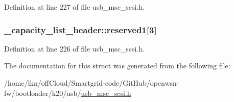 Definition at line 227 of file usb\+\_\+msc\+\_\+scsi.\+h.

\subsubsection[{\texorpdfstring{reserved1}{reserved1}}]{ \+\_\+capacity\+\_\+list\+\_\+header\+::reserved1\mbox{[}3\mbox{]}}\hypertarget{struct__capacity__list__header_a08fab2ca6acf1044c6f6d4ef700fd8a4}{}\label{struct__capacity__list__header_a08fab2ca6acf1044c6f6d4ef700fd8a4}


Definition at line 226 of file usb\+\_\+msc\+\_\+scsi.\+h.



The documentation for this struct was generated from the following file\+:\begin{DoxyCompactItemize}
\item 
/home/lkn/off\+Cloud/\+Smartgrid-\/code/\+Git\+Hub/openwsn-\/fw/bootloader/k20/usb/\hyperlink{usb__msc__scsi_8h}{usb\+\_\+msc\+\_\+scsi.\+h}\end{DoxyCompactItemize}
